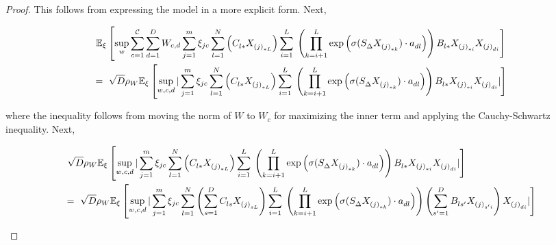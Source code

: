 \begin{proof}
This follows from expressing the model in a more explicit form. Next,
\begin{small}
\begin{equation*}
\begin{aligned}
&~ \mathbb{E}_{\xi}\left[\sup_{w} \sum_{c=1}^{\mathcal{C}}  \sum_{d=1}^D W_{c,d} \sum_{j=1}^m \xi_{jc} \sum_{l=1}^N \left(C_{l*}^{} X^{}_{{(j)}_{*L}}\right) \sum_{i=1}^L \right.  \left. \left(\prod_{k=i+1}^L \exp\left(\sigma(S^{}_{\Delta} X^{}_{{(j)}_{*k}}) \cdot a^{}_{dl}\right) \right) B_{l*}^{} X^{}_{{(j)}_{*i}} X^{}_{{(j)}_{di}} \right] \\
&=~ \sqrt{D} \rho_W \mathbb{E}_{\xi}\left[\sup_{w,c, d}   | \sum_{j=1}^m \xi_{jc} \sum_{l=1}^N \left(C_{l*}^{} X^{}_{{(j)}_{*L}}\right) \sum_{i=1}^L \right.\left. \left(\prod_{k=i+1}^L \exp\left(\sigma(S^{}_{\Delta} X^{}_{{(j)}_{*k}}) \cdot a^{}_{dl}\right) \right) B_{l*}^{} X^{}_{{(j)}_{*i}} X^{}_{{(j)}_{di}} | \right]
\end{aligned}
\end{equation*}
\end{small}
where the inequality follows from moving the norm of $W$ to $W_{c}$ for maximizing the inner term and applying the Cauchy-Schwartz inequality.
Next,
\begin{small}
\begin{equation*}
\begin{aligned}
&~ \sqrt{D} \rho_W \E_{\xi}\left[\sup_{w,c, d}   | \sum_{j=1}^m \xi_{jc} \sum_{l=1}^N \left(C_{l*}^{} X^{}_{{(j)}_{*L}}\right) \sum_{i=1}^L \right.  \left. \left(\prod_{k=i+1}^L \exp\left(\sigma(S^{}_{\Delta} X^{}_{{(j)}_{*k}}) \cdot a^{}_{dl}\right) \right) B_{l*}^{} X^{}_{{(j)}_{*i}} X^{}_{{(j)}_{di}} | \right] \\
&=~ \sqrt{D} \rho_W \E_{\xi}\left[\sup_{w,c, d}   | \sum_{j=1}^m \xi_{jc} \sum_{l=1}^N \left(\sum_{s=1}^D C_{ls}^{} X^{}_{{(j)}_{sL}}\right) \sum_{i=1}^L \right.  \left. \left(\prod_{k=i+1}^L \exp\left(\sigma(S^{}_{\Delta} X^{}_{{(j)}_{*k}}) \cdot a^{}_{dl}\right) \right) \left(\sum_{s'=1}^DB_{ls'}^{} X^{}_{{(j)}_{s'i}} \right) X^{}_{{(j)}_{di}} | \right] \\

\end{aligned}
\end{equation*}
\end{small}
\end{proof}
